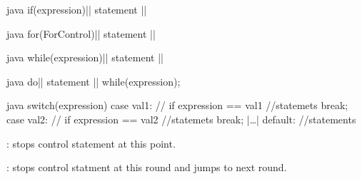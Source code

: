 \begin{sectionbox}[\subsubsection*{If}]\nospacing
  \begin{mintlinebox}{java}
		if(expression)|\optlc| statement |\optrc{}|
  \end{mintlinebox}
\end{sectionbox}
\begin{sectionbox}\nospacing
  \begin{mintlinebox}{java}
		for(ForControl)|\optlc| statement |\optrc|
  \end{mintlinebox}
\end{sectionbox}
\begin{sectionbox}\nospacing
  \begin{mintlinebox}{java}
		while(expression)|\optlc| statement |\optrc|
  \end{mintlinebox}
\end{sectionbox}
\begin{sectionbox}\nospacing
  \begin{mintlinebox}{java}
		do|\optlc| statement |\optrc| while(expression);
  \end{mintlinebox}
\end{sectionbox}
\begin{sectionbox}\nospacing
  \begin{mintlinebox}{java}
switch(expression){
  case val1: // if expression == val1
    //statemets
  break;
  case val2: // if expression == val2
    //statemets
  break;
    |\ldots|
  default:
    //statements
}
  \end{mintlinebox}
\end{sectionbox}
\begin{notebox}[Notes]\nospacing
  \begin{itemizenosep}
      \item {}: stops control statement at this point.
      \item {}: stops control statment at this round and
    jumps to next round.
  \end{itemizenosep}
\end{notebox}
